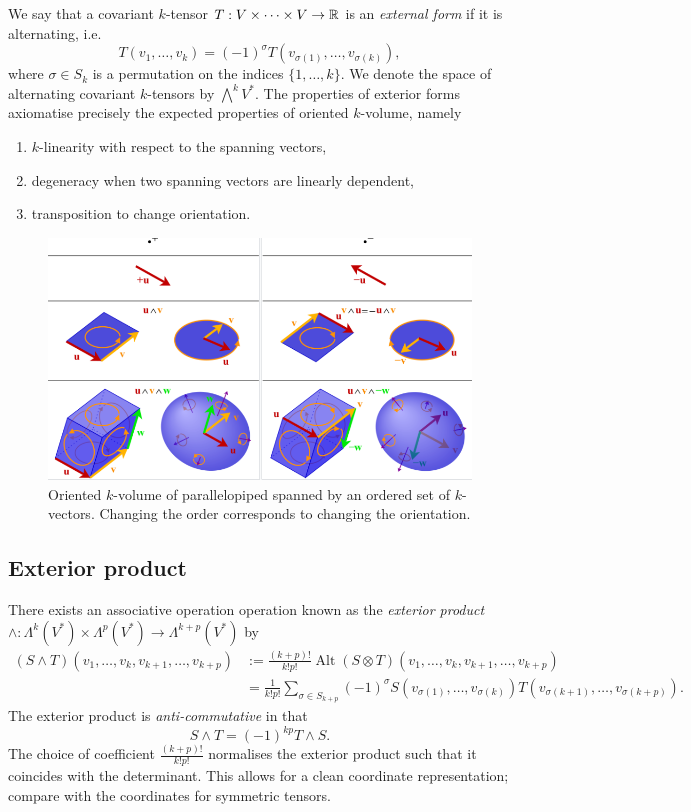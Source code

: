 

We say that a covariant $k$-tensor  $T: V \times \dots \times V \to \mathbb R$ is an \emph{external form} if it is alternating, i.e.
	\[ T(v_1, \dots, v_k) = (-1)^\sigma T(v_{\sigma(1)}, \dots, v_{\sigma(k)}),\]
where $\sigma \in S_k$ is a permutation on the indices $\{1, \dots, k\}$. We denote the space of alternating covariant $k$-tensors by $\bigwedge^k V^*$. The properties of exterior forms axiomatise precisely the expected properties of oriented $k$-volume, namely
\begin{enumerate}
	\item $k$-linearity with respect to the spanning vectors,
	\item degeneracy when two spanning vectors are linearly dependent,
	\item transposition to change orientation.
\end{enumerate}

\begin{figure}[h]
	\begin{center}
		\includegraphics[scale =0.6]{graphics/wedge}
		\caption{Oriented $k$-volume of parallelopiped spanned by an ordered set of $k$-vectors. Changing the order corresponds to changing the orientation.}
	\end{center}
\end{figure}

\subsection{Exterior product}

There exists an associative operation operation known as the \emph{exterior product} $\wedge : \Lambda^k (V^*) \times \Lambda^p (V^*) \to\Lambda^{k + p} (V^*)$ by  
	\begin{align*}
		(S \wedge T) (v_1, \dots, v_k, v_{k + 1}, \dots, v_{k + p}) 
			&:= \frac{(k + p)!}{k! p!}\operatorname{Alt} (S \otimes T)(v_1, \dots, v_k, v_{k + 1}, \dots, v_{k + p})  \\
			&= \frac{1}{k! p!} \sum_{\sigma \in  S_{k + p}} (-1)^\sigma S(v_{\sigma(1)}, \dots, v_{\sigma(k)}) T(v_{\sigma(k + 1)}, \dots, v_{\sigma(k + p)}).
	\end{align*}	
The exterior product is \textit{anti-commutative} in that 
	\[ S \wedge T = (-1)^{k  p} T \wedge S. \]
The choice of coefficient $\tfrac{(k + p)!}{k! p!}$ normalises the exterior product such that it coincides with the determinant. This allows for a clean coordinate representation; compare with the coordinates for symmetric tensors. 
	

